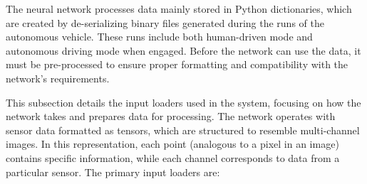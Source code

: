 The neural network processes data mainly stored in Python dictionaries, which are created by de-serializing binary files generated during the runs of the autonomous vehicle. These runs include both human-driven mode and autonomous driving mode when engaged. Before the network can use the data, it must be pre-processed to ensure proper formatting and compatibility with the network's requirements.

This subsection details the input loaders used in the system, focusing on how the network takes and prepares data for processing. The network operates with sensor data formatted as tensors, which are structured to resemble multi-channel images. In this representation, each point (analogous to a pixel in an image) contains specific information, while each channel corresponds to data from a particular sensor. 
The primary input loaders are:

